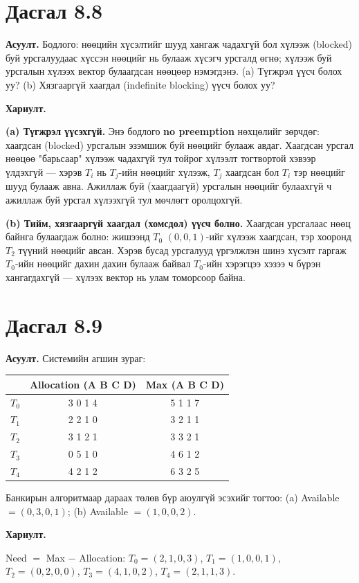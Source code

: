 \documentclass[12pt,a4paper]{article}
\newcommand{\question}[2]{\section{Дасгал #1}\textbf{Асуулт.} #2\par\medskip\textbf{Хариулт.}\par}
\begin{document}
\question{8.8}{Бодлого: нөөцийн хүсэлтийг шууд хангаж чадахгүй бол хүлээж (blocked) буй урсгалуудаас хүссэн нөөцийг нь булааж хүсэгч урсгалд өгнө; хүлээж буй урсгалын хүлээх вектор булаагдсан нөөцөөр нэмэгдэнэ. (a) Түгжрэл үүсч болох уу? (b) Хязгааргүй хаагдал (indefinite blocking) үүсч болох уу?}

\textbf{(a) Түгжрэл үүсэхгүй.} Энэ бодлого \textbf{no preemption} нөхцөлийг зөрчдөг: хаагдсан (blocked) урсгалын эзэмшиж буй нөөцийг булааж авдаг. Хаагдсан урсгал нөөцөө "барьсаар" хүлээж чадахгүй тул тойрог хүлээлт тогтвортой хэвээр үлдэхгүй — хэрэв $T_i$ нь $T_j$-ийн нөөцийг хүлээж, $T_j$ хаагдсан бол $T_i$ тэр нөөцийг шууд булааж авна. Ажиллаж буй (хаагдаагүй) урсгалын нөөцийг булаахгүй ч ажиллаж буй урсгал хүлээхгүй тул мөчлөгт оролцохгүй.

\textbf{(b) Тийм, хязгааргүй хаагдал (хомсдол) үүсч болно.} Хаагдсан урсгалаас нөөц байнга булаагдаж болно: жишээнд $T_0$ $(0,0,1)$-ийг хүлээж хаагдсан, тэр хооронд $T_2$ түүний нөөцийг авсан. Хэрэв бусад урсгалууд үргэлжлэн шинэ хүсэлт гаргаж $T_0$-ийн нөөцийг дахин дахин булааж байвал $T_0$-ийн хэрэгцээ хэзээ ч бүрэн хангагдахгүй — хүлээх вектор нь улам томорсоор байна.

\question{8.9}{Системийн агшин зураг:
\begin{center}
\begin{tabular}{lcc}
\toprule
 & Allocation (A B C D) & Max (A B C D)\\
\midrule
$T_0$ & 3 0 1 4 & 5 1 1 7\\
$T_1$ & 2 2 1 0 & 3 2 1 1\\
$T_2$ & 3 1 2 1 & 3 3 2 1\\
$T_3$ & 0 5 1 0 & 4 6 1 2\\
$T_4$ & 4 2 1 2 & 6 3 2 5\\
\bottomrule
\end{tabular}
\end{center}
Банкирын алгоритмаар дараах төлөв бүр аюулгүй эсэхийг тогтоо: (a) Available $=(0,3,0,1)$; (b) Available $=(1,0,0,2)$.}

Need $=$ Max $-$ Allocation: $T_0 = (2,1,0,3)$, $T_1 = (1,0,0,1)$, $T_2 = (0,2,0,0)$, $T_3 = (4,1,0,2)$, $T_4 = (2,1,1,3)$.
\end{document}
